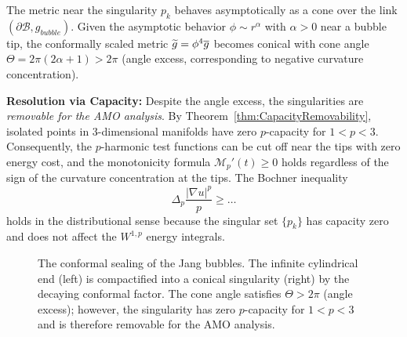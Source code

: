 \begin{remark}
The metric near the singularity $p_k$ behaves asymptotically as a cone over the link $(\partial \mathcal{B}, g_{bubble})$. Given the asymptotic behavior $\phi \sim r^\alpha$ with $\alpha > 0$ near a bubble tip, the conformally scaled metric $\widetilde{g} = \phi^4 \overline{g}$ becomes conical with cone angle $\Theta = 2\pi(2\alpha + 1) > 2\pi$ (angle excess, corresponding to negative curvature concentration).

\textbf{Resolution via Capacity:} Despite the angle excess, the singularities are \emph{removable for the AMO analysis}. By Theorem~\ref{thm:CapacityRemovability}, isolated points in 3-dimensional manifolds have zero $p$-capacity for $1 < p < 3$. Consequently, the $p$-harmonic test functions can be cut off near the tips with zero energy cost, and the monotonicity formula $\mathcal{M}_p'(t) \ge 0$ holds regardless of the sign of the curvature concentration at the tips. The Bochner inequality
\[ \Delta_p \frac{|\nabla u|^p}{p} \ge \dots \]
holds in the distributional sense because the singular set $\{p_k\}$ has capacity zero and does not affect the $W^{1,p}$ energy integrals.
\end{remark}

\begin{figure}[htbp]
\centering
{}
\caption{The conformal sealing of the Jang bubbles. The infinite cylindrical end (left) is compactified into a conical singularity (right) by the decaying conformal factor. The cone angle satisfies $\Theta > 2\pi$ (angle excess); however, the singularity has zero $p$-capacity for $1 < p < 3$ and is therefore removable for the AMO analysis.}
\label{fig:ConformalSealing}
\end{figure}

